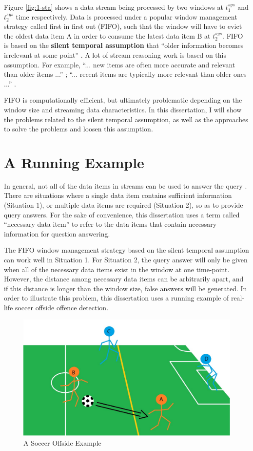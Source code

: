 Figure \ref{fig:1-sta} shows a data stream being processed by two windows at $t^{sys}_1$ and $t^{sys}_2$ time respectively. 
Data is processed under a popular window management strategy called first in first out (FIFO), such that the window will have to evict the oldest data item A in order to consume the latest data item B at $t^{sys}_{2}$.
FIFO is based on the \textbf{silent temporal assumption} that ``older information becomes irrelevant at some point'' \cite{barbieri2010stream} \cite{stuckenschmidt2010towards}.
A lot of stream reasoning work is based on this assumption.
For example, 
``... new items are often more accurate and relevant than older items ...'' \cite{golab2003processing};
``... recent items are typically more relevant than older ones ...'' \cite{barbieri2010deductive}.

FIFO is computationally efficient, but ultimately problematic depending on the window size and streaming data characteristics. 
In this dissertation, I will show the problems related to the silent temporal assumption, as well as the approaches to solve the problems and loosen this assumption. 
%
\section{A Running Example}
In general, not all of the data items in streams can be used to answer the query \cite{mileo2013streamrule}.
There are situations where a single data item contains sufficient information (Situation 1), or multiple data items are required (Situation 2), so as to provide query answers. 
For the sake of convenience, this dissertation uses a term called ``necessary data item'' to refer to the data items that contain necessary information for question answering. 

The FIFO window management strategy based on the silent temporal assumption can work well in Situation 1. 
For Situation 2, the query answer will only be given when all of the necessary data items exist in the window at one time-point. 
However, the distance among necessary data items can be arbitrarily apart, and if this distance is longer than the window size, false answers will be generated. 
In order to illustrate this problem, this dissertation uses a running example of real-life soccer offside offence detection.

\begin{figure}[!htbp]
	\centering
	\includegraphics[width=5in]{img/1-soe.pdf}
	\caption{A Soccer Offside Example}
	\label{fig:1-soe} 
\end{figure}


